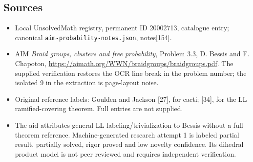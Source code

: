 \documentclass[11pt]{article}
\begin{document}
\subsection{Sources}
\begin{itemize}
\item Local UnsolvedMath registry, permanent ID 20002713, catalogue entry; canonical \texttt{aim-probability-notes.json}, notes[154].
\item AIM \emph{Braid groups, clusters and free probability}, Problem 3.3, D. Bessis and F. Chapoton, \url{https://aimath.org/WWN/braidgroups/braidgroups.pdf}. The supplied verification restores the OCR line break in the problem number; the isolated 9 in the extraction is page-layout noise.
\item Original reference labels: Goulden and Jackson [27], for cacti; [34], for the LL ramified-covering theorem. Full entries are not supplied.
\item The aid attributes general LL labeling/trivialization to Bessis without a full theorem reference. Machine-generated research attempt 1 is labeled partial result, partially solved, rigor proved and low novelty confidence. Its dihedral product model is not peer reviewed and requires independent verification.
\end{itemize}
\end{document}
